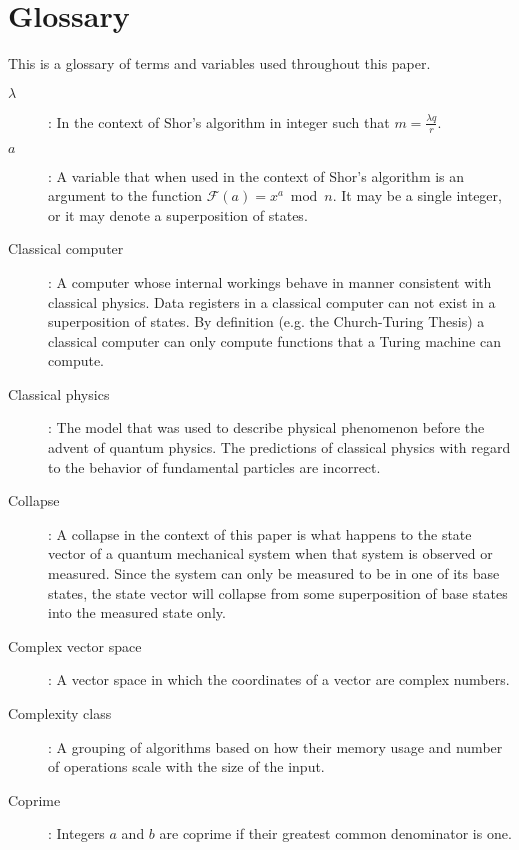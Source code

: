 \documentclass[]{article}
\begin{document}
\section{Glossary}

This is a glossary of terms and variables used throughout this paper.

\begin{description}

\item[$\lambda$]:
	In the context of Shor's algorithm in integer such that $m =
\frac{\lambda q}{r}$.

\item[$a$]:
	A variable that when used in the context of Shor's algorithm
is an argument to the function $\mathcal{F}(a) = x^{a} \bmod n$. It may
be a single integer, or it may denote a superposition of states.

\item[Classical computer]: 
        A computer whose internal workings behave in manner consistent
        with classical physics.  Data registers in a classical
        computer can not exist in a superposition of states.  By
        definition (e.g. the Church-Turing Thesis) a classical
        computer can only compute functions that a Turing machine can
        compute.

\item[Classical physics]:
	The model that was used to describe physical phenomenon before
the advent of quantum physics.  The predictions of classical physics
with regard to the behavior of fundamental particles are incorrect.

\item[Collapse]:
	A collapse in the context of this paper is what happens to the
state vector of a quantum mechanical system when that system is
observed or measured.  Since the system can only be measured to be in
one of its base states, the state vector will collapse from some
superposition of base states into the measured state only.

\item[Complex vector space]:
	A vector space in which the coordinates of a vector are
complex numbers.

\item[Complexity class]:
	A grouping of algorithms based on how their memory usage and
number of operations scale with the size of the input.

\item[Coprime]:
	Integers $a$ and $b$ are coprime if their greatest common
denominator is one.


\end{description}
\end{document}

